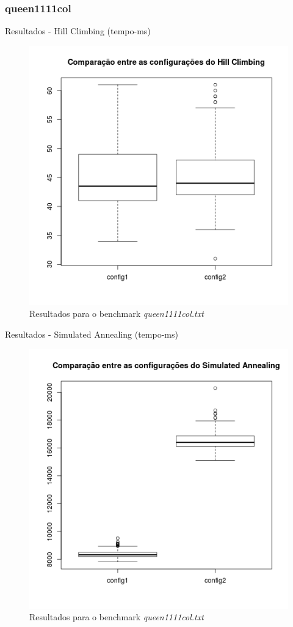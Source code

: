 \documentclass[compress, hide notes]{beamer}
\begin{document}
        \subsubsection{queen1111col}
		
        \begin{frame}{Resultados - Hill Climbing (tempo-ms)}
        
        	\begin{figure}[H]
			\centering
            \label{fig:tmp-hc-queen1111col}
            \includegraphics[width=0.6\linewidth]{img/hill-tmp-queen1111col.png}
            \caption[Resultados para o benchmark queen1111col.txt]{Resultados para o benchmark \textit{queen1111col.txt}}
			\end{figure}

		\end{frame}
        
        \begin{frame}{Resultados - Simulated Annealing (tempo-ms)}
        
        	\begin{figure}[H]
			\centering
            \label{fig:tmp-sa-queen1111col}
            \includegraphics[width=0.6\linewidth]{img/sa-tmp-queen1111col.png}
            \caption[Resultados para o benchmark queen1111col.txt]{Resultados para o benchmark \textit{queen1111col.txt}}
			\end{figure}

		\end{frame}
        
\end{document}
